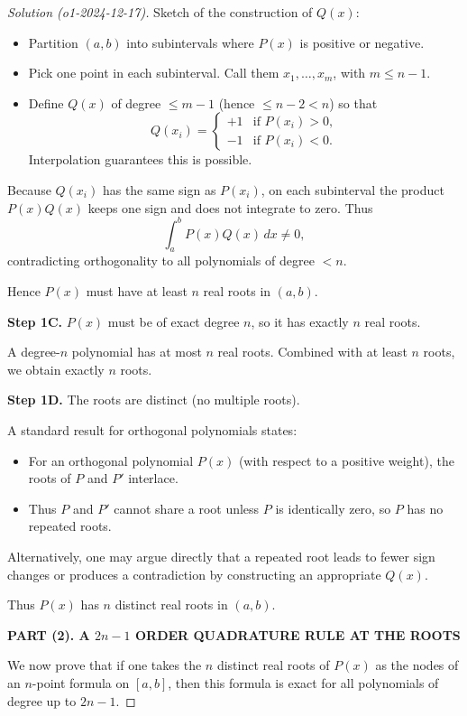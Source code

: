 \documentclass[11pt]{article}
\numberwithin{equation}{section}
\begin{document}
\begin{proof}[Solution (o1-2024-12-17)]
Sketch of the construction of $Q(x)$:
\begin{itemize}
\item Partition $(a,b)$ into subintervals where $P(x)$ is positive or negative.
\item Pick one point in each subinterval. Call them $x_1,\dots,x_m$, with $m\le n-1$.
\item Define $Q(x)$ of degree $\le m-1$ (hence $\le n-2 < n$) so that
\[
Q(x_i)=
\begin{cases}
+1 & \text{if } P(x_i)>0,\\
-1 & \text{if } P(x_i)<0.
\end{cases}
\]
Interpolation guarantees this is possible.
\end{itemize}

Because $Q(x_i)$ has the same sign as $P(x_i)$, on each subinterval the product $P(x)Q(x)$ keeps one sign and does not integrate to zero. Thus
\[
\int_a^b P(x)Q(x)\, dx \ne 0,
\]
contradicting orthogonality to all polynomials of degree $<n$.

Hence $P(x)$ must have at least $n$ real roots in $(a,b)$.

\textbf{Step 1C.} $P(x)$ must be of exact degree $n$, so it has exactly $n$ real roots.

A degree-$n$ polynomial has at most $n$ real roots.  Combined with at least $n$ roots, we obtain exactly $n$ roots.

\textbf{Step 1D.} The roots are distinct (no multiple roots).

A standard result for orthogonal polynomials states:
\begin{itemize}
\item For an orthogonal polynomial $P(x)$ (with respect to a positive weight), the roots of $P$ and $P'$ interlace.
\item Thus $P$ and $P'$ cannot share a root unless $P$ is identically zero, so $P$ has no repeated roots.
\end{itemize}

Alternatively, one may argue directly that a repeated root leads to fewer sign changes or produces a contradiction by constructing an appropriate $Q(x)$.

Thus $P(x)$ has $n$ distinct real roots in $(a,b)$.


\textbf{PART (2).  A $2n-1$ ORDER QUADRATURE RULE AT THE ROOTS}


We now prove that if one takes the $n$ distinct real roots of $P(x)$ as the nodes of an $n$-point formula on $[a,b]$, then this formula is exact for all polynomials of degree up to $2n-1$.


\end{proof}
\end{document}
